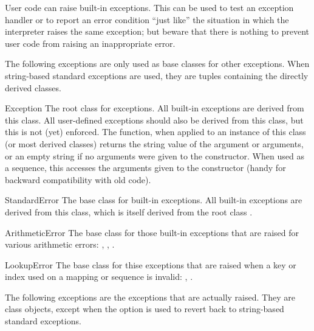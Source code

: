 User code can raise built-in exceptions.  This can be used to test an
exception handler or to report an error condition ``just like'' the
situation in which the interpreter raises the same exception; but
beware that there is nothing to prevent user code from raising an
inappropriate error.


The following exceptions are only used as base classes for other
exceptions.  When string-based standard exceptions are used, they
are tuples containing the directly derived classes.

\begin{excdesc}{Exception}
The root class for exceptions.  All built-in exceptions are derived
from this class.  All user-defined exceptions should also be derived
from this class, but this is not (yet) enforced.  The 
function, when applied to an instance of this class (or most derived
classes) returns the string value of the argument or arguments, or an
empty string if no arguments were given to the constructor.  When used
as a sequence, this accesses the arguments given to the constructor
(handy for backward compatibility with old code).
\end{excdesc}

\begin{excdesc}{StandardError}
The base class for built-in exceptions.  All built-in exceptions are
derived from this class, which is itself derived from the root class
.
\end{excdesc}

\begin{excdesc}{ArithmeticError}
The base class for those built-in exceptions that are raised for
various arithmetic errors: ,
, .
\end{excdesc}

\begin{excdesc}{LookupError}
The base class for thise exceptions that are raised when a key or
index used on a mapping or sequence is invalid: ,
.
\end{excdesc}


The following exceptions are the exceptions that are actually raised.
They are class objects, except when the  option is used to
revert back to string-based standard exceptions.

